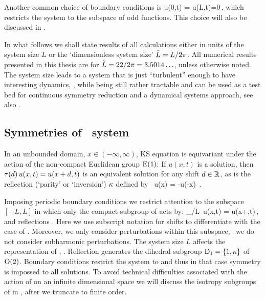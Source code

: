 Another common choice of boundary conditions is
\beq
  u(0,t) = u(L,t)=0\,,
 \label{eq:KSodd}
\eeq
which restricts the system to the subspace of odd functions. This choice will also be discussed
in .

In what follows
we shall state results of all calculations either in units of the system size $L$
or the `dimensionless system size' $\tilde{L}=L/2\pi$.
All numerical results presented in this thesis
are for $\tilde{L}=22/2\pi = 3.5014\ldots$, unless otherwise
noted. The system size leads to a system that is just ``turbulent'' enough
to have interesting dynamics, \cf {}, while being still
rather tractable and can be used  as a test bed for
continuous symmetry reduction and a dynamical systems approach, see also .

\subsection{Symmetries of \KS\ system}
\label{sec:KSeSymm}

In an unbounded domain, $x\in(-\infty,\infty)$, KS equation is equivariant
under the action of the non-compact Euclidean group $\mathrm{E}(1)$:
If $u(x,t)$ is a solution, then
$\tau({d})\, u(x,t) = u(x+d,t)$
is an equivalent solution for any shift
$d\in\mathbb{R}^{}$, as is the reflection (`parity' or `inversion') $\kappa$ defined by
\beq
    \Refl \, u(x) = -u(-x)
\,.

Imposing periodic boundary conditions we restrict attention to the subspace
$[-L,L]$ in which only the compact subgroup  of  acts by:
\beq
	\Shift_{\shift/L}\, u(x,t) = u(x+\shift,t)\,,\qquad \shift\in\left[-L/2,L/2\right]	
	\label{KSshift}
\eeq
and reflections . Here we use subscript
notation for shifts to differentiate with the case of .
Moreover, we only consider perturbations within this subspace,
\ie\ we do not consider subharmonic perturbations. The system
size $L$ affects the representation of , \cf
{}.  Reflection
generates the dihedral subgroup $\mathrm{D}_{1} = \{1, \kappa\}$ of
$\mathrm{O}(2)$. Boundary conditions  restrict the
system to  and thus in that case symmetry 
is impossed to all solutions. To avoid technical difficulties
associated with the action of  on an infinite dimensional
space we will discuss the isotropy subgroups of  in
, after we truncate  to finite
order.


